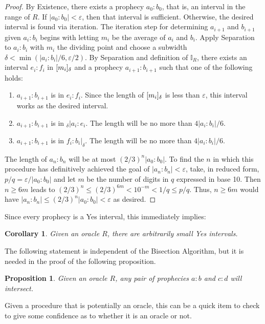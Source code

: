 \documentclass[12pt]{article}
\newtheorem{corollary}{Corollary}[section]
\newtheorem{proposition}{Proposition}[section]
\begin{document}
\begin{proof}
    By Existence, there exists a prophecy $a_0:b_0$, that is, an interval in the range of $R$. If $|a_0:b_0| < \varepsilon$, then that interval is sufficient. Otherwise, the desired interval is found via iteration. The iteration step for determining $a_{i+1}$ and $b_{i+1}$ given $a_i:b_i$ begins with letting $m_i$ be the average of $a_i$ and $b_i$. Apply Separation to $a_i:b_i$ with $m_i$ the dividing point and choose a subwidth $\delta < \min(|a_i:b_i|/6, \varepsilon /2)$. By Separation and definition of $\mathbb{I}_R$, there exists an interval $e_i:f_i$ in $[m_i]_{\delta}$ and a prophecy $a_{i+1}:b_{i+1}$ such that one of the following holds: 
    \begin{enumerate}
        \item $a_{i+1}:b_{i+1}$ is in $e_i:f_i$. Since the length of $[m_i]_{\delta}$ is less than $\varepsilon$, this interval works as the desired interval.  
        \item  $a_{i+1}:b_{i+1}$ is in ${}_\delta|a_i :e_i$. The length will be no more than $4|a_i:b_i|/6$.
        \item  $a_{i+1}:b_{i+1}$ is in $f_i:b_i|_\delta$. The length will be no more than $4|a_i:b_i|/6$.
    \end{enumerate}
    The length of $a_n:b_n$ will be at most $(2/3)^n |a_0:b_0|$. To find the $n$ in which this procedure has definitively achieved the goal of $|a_n:b_n|<\varepsilon$,  take, in reduced form, $p/q = \varepsilon/|a_0:b_0|$ and let $m$ be the number of digits in $q$ expressed in base 10. Then $n \geq  6m$ leads to  $(2/3)^n \leq (2/3)^{6m} < 10^{-m} < 1/q \leq p/q$. Thus, $n \geq 6m$ would have $|a_n:b_n| \leq (2/3)^n |a_0:b_0| < \varepsilon$ as desired. 
\end{proof}

Since every prophecy is a Yes interval, this immediately implies:
\begin{corollary}
    Given an oracle $R$, there are arbitrarily small Yes intervals. 
\end{corollary}

The following statement is independent of the Bisection Algorithm, but it is needed in the proof of the following proposition. 

\begin{proposition}\label{os:prointer}
    Given an oracle $R$, any pair of prophecies $a:b$ and $c:d$ will intersect. 
\end{proposition}

Given a procedure that is potentially an oracle, this can be a quick item to check to give some confidence as to whether it is an oracle or not. 
\end{document}
